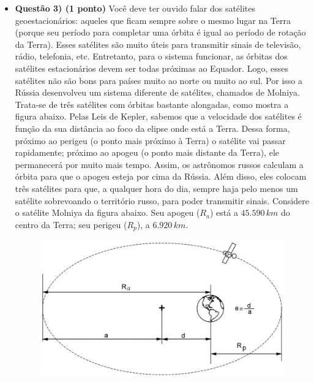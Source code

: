 \documentclass[a4paper, 12pt]{article}
\begin{document}
\begin{flushleft}
\begin{itemize}
            \item \textbf{Questão 3) (1 ponto)} Você deve ter ouvido falar dos satélites geoestacionários: aqueles que ficam sempre sobre o mesmo lugar na Terra (porque seu período para completar uma órbita é igual ao período de rotação da Terra). Esses satélites são muito úteis para transmitir sinais de televisão, rádio, telefonia, etc. \linebreak \linebreak Entretanto, para o sistema funcionar, as órbitas dos satélites estacionários devem ser todas próximas ao Equador. Logo, esses satélites não são bons para países muito ao norte ou muito ao sul. Por isso a Rússia desenvolveu um sistema diferente de satélites, chamados de Molniya. Trata-se de três satélites com órbitas bastante alongadas, como mostra a figura abaixo. \linebreak \linebreak Pelas Leis de Kepler, sabemos que a velocidade dos satélites é função da sua distância ao foco da elipse onde está a Terra. Dessa forma, próximo ao perigeu (o ponto mais próximo à Terra) o satélite vai passar rapidamente; próximo ao apogeu (o ponto mais distante da Terra), ele permanecerá por muito mais tempo. Assim, os astrônomos russos calculam a órbita para que o apogeu esteja por cima da Rússia. Além disso, eles colocam três satélites para que, a qualquer hora do dia, sempre haja pelo menos um satélite sobrevoando o território russo, para poder transmitir sinais. \linebreak \linebreak Considere o satélite Molniya da figura abaixo. Seu apogeu ($R_a$) está a $45.590 \, km$ do centro da Terra; seu perigeu ($R_p$), a $6.920 \, km$.
                \begin{figure}[H]
                    \centering
                    \includegraphics[scale=0.5]{img/3.png}

\end{figure}
\end{itemize}
\end{flushleft}
\end{document}
